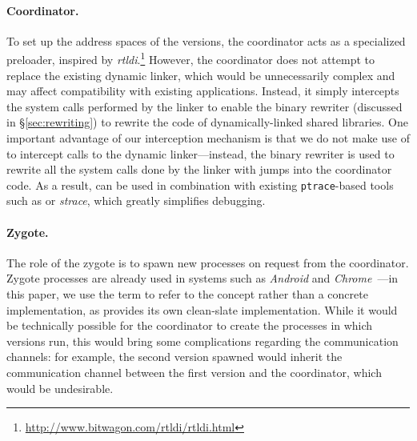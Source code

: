 

\paragraph{Coordinator.}  To set up the address spaces of the versions,
the coordinator acts as a specialized preloader, inspired by
\emph{rtldi}.\footnote{\url{http://www.bitwagon.com/rtldi/rtldi.html}}
However, the coordinator does not attempt to replace the existing
dynamic linker, which would be unnecessarily complex and may affect
compatibility with existing applications. Instead, it simply
intercepts the system calls performed by the linker to enable the
binary rewriter (discussed in \S\ref{sec:rewriting}) to rewrite the
code of dynamically-linked shared libraries.  One important advantage
of our interception mechanism is that we do not make use of \ptrace to
intercept calls to the dynamic linker---instead, the binary rewriter
is used to rewrite all the system calls done by the linker with jumps
into the coordinator code.  As a result, \varan can be used in
combination with existing \lstinline`ptrace`-based tools such as \gdb
or \emph{strace}, which greatly simplifies debugging.





\paragraph{Zygote.} The role of the zygote is to spawn new processes on
request from the coordinator.  Zygote processes are already used in
systems such as \emph{Android} and
\emph{Chrome}~\cite{linuxzygote}---in this paper, we use the term to
refer to the concept rather than a concrete implementation, as \varan
provides its own clean-slate implementation.  While it would be
technically possible for the coordinator to create the processes in
which versions run, this would bring some complications regarding the
communication channels: for example, the second version spawned would
inherit the communication channel between the first version and the
coordinator, which would be undesirable.

